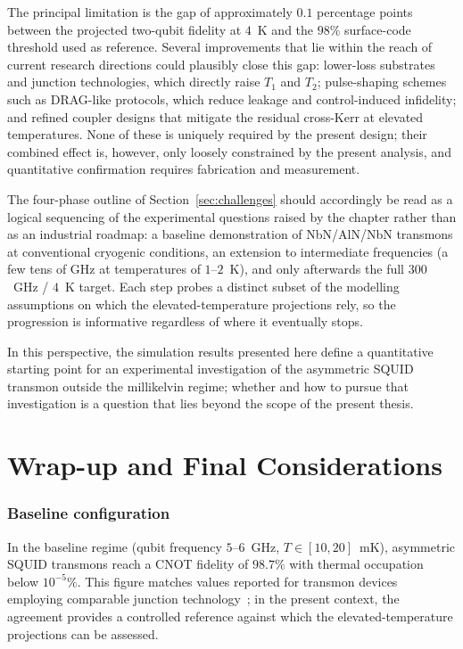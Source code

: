 The principal limitation is the gap of approximately $0.1$ percentage points between the projected two-qubit fidelity at $4$~K and the $98\%$ surface-code threshold used as reference. Several improvements that lie within the reach of current research directions could plausibly close this gap: lower-loss substrates and junction technologies, which directly raise $T_1$ and $T_2$; pulse-shaping schemes such as DRAG-like protocols, which reduce leakage and control-induced infidelity; and refined coupler designs that mitigate the residual cross-Kerr at elevated temperatures. None of these is uniquely required by the present design; their combined effect is, however, only loosely constrained by the present analysis, and quantitative confirmation requires fabrication and measurement.

The four-phase outline of Section~\ref{sec:challenges} should accordingly be read as a logical sequencing of the experimental questions raised by the chapter rather than as an industrial roadmap: a baseline demonstration of NbN/AlN/NbN transmons at conventional cryogenic conditions, an extension to intermediate frequencies (a few tens of GHz at temperatures of $1$--$2$~K), and only afterwards the full $300$~GHz / $4$~K target. Each step probes a distinct subset of the modelling assumptions on which the elevated-temperature projections rely, so the progression is informative regardless of where it eventually stops.

In this perspective, the simulation results presented here define a quantitative starting point for an experimental investigation of the asymmetric SQUID transmon outside the millikelvin regime; whether and how to pursue that investigation is a question that lies beyond the scope of the present thesis.


\section{Wrap-up and Final Considerations}

\subsubsection*{Baseline configuration}

In the baseline regime (qubit frequency $5$--$6$~GHz, $T \in [10,20]$~mK), asymmetric SQUID transmons reach a CNOT fidelity of $98.7\%$ with thermal occupation below $10^{-5}\%$. This figure matches values reported for transmon devices employing comparable junction technology~\cite{krantz2019,kim2021}; in the present context, the agreement provides a controlled reference against which the elevated-temperature projections can be assessed.

